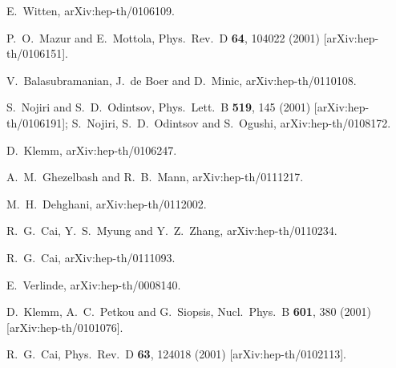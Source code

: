\documentclass[a4paper,12pt]{article}
\begin{document}
\begin{thebibliography}{99}
E.~Witten,
arXiv:hep-th/0106109.
 
P.~O.~Mazur and E.~Mottola,
Phys.\ Rev.\ D {\bf 64}, 104022 (2001)
[arXiv:hep-th/0106151].


V.~Balasubramanian, J.~de Boer and D.~Minic,
arXiv:hep-th/0110108.

S.~Nojiri and S.~D.~Odintsov,
Phys.\ Lett.\ B {\bf 519}, 145 (2001)
[arXiv:hep-th/0106191];
S.~Nojiri, S.~D.~Odintsov and S.~Ogushi,
arXiv:hep-th/0108172.

 
D.~Klemm,
arXiv:hep-th/0106247.


A.~M.~Ghezelbash and R.~B.~Mann,
arXiv:hep-th/0111217.

M.~H.~Dehghani,
arXiv:hep-th/0112002.


R.~G.~Cai, Y.~S.~Myung and Y.~Z.~Zhang,
arXiv:hep-th/0110234.

R.~G.~Cai,
arXiv:hep-th/0111093.

E.~Verlinde,
arXiv:hep-th/0008140.

D.~Klemm, A.~C.~Petkou and G.~Siopsis,
Nucl.\ Phys.\ B {\bf 601}, 380 (2001)
[arXiv:hep-th/0101076].

R.~G.~Cai,
Phys.\ Rev.\ D {\bf 63}, 124018 (2001)
[arXiv:hep-th/0102113].


\end{thebibliography}
\end{document}
